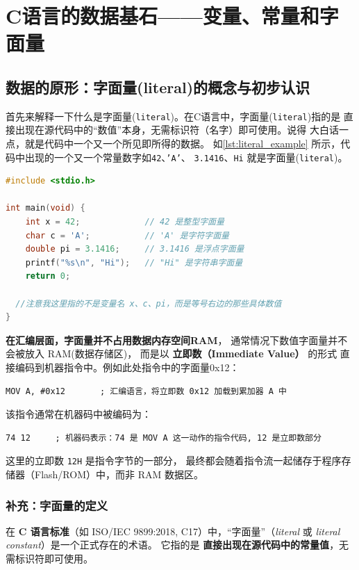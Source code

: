 \section{C语言的数据基石——变量、常量和字面量}

\subsection{数据的原形：字面量(literal)的概念与初步认识}

首先来解释一下什么是字面量(\texttt{literal})。在C语言中，字面量(\texttt{literal})指的是
直接出现在源代码中的“数值”本身，无需标识符（名字）即可使用。说得
大白话一点，就是代码中一个又一个所见即所得的数据。
如\autoref{lst:literal_example}
所示，代码中出现的一个又一个常量数字如\texttt{42}、\texttt{'A'}、
\texttt{3.1416}、\texttt{Hi}
就是字面量(\texttt{literal})。


\begin{lstlisting}[language=C,caption={C 语言中字面量的示例},label={lst:literal_example}]
#include <stdio.h>

int main(void) {
    int x = 42;             // 42 是整型字面量
    char c = 'A';           // 'A' 是字符字面量
    double pi = 3.1416;     // 3.1416 是浮点字面量
    printf("%s\n", "Hi");   // "Hi" 是字符串字面量
    return 0;

  //注意我这里指的不是变量名 x、c、pi，而是等号右边的那些具体数值  
}
\end{lstlisting}

\textbf{在汇编层面，字面量并不占用数据内存空间RAM}，
通常情况下数值字面量并不会被放入 RAM(数据存储区)，
而是以 \textbf{立即数（Immediate Value）} 的形式
直接编码到机器指令中。例如此处指令中的字面量0x12：

\begin{lstlisting}
MOV A, #0x12       ; 汇编语言，将立即数 0x12 加载到累加器 A 中
\end{lstlisting}

该指令通常在机器码中被编码为：

\begin{lstlisting}
74 12     ; 机器码表示：74 是 MOV A 这一动作的指令代码, 12 是立即数部分
\end{lstlisting}

这里的立即数 \verb|12H| 是指令字节的一部分，
最终都会随着指令流一起储存于程序存储器（Flash/ROM）中，而非 RAM 数据区。

\subsubsection{补充：字面量的定义}
在 \textbf{C 语言标准}（如 ISO/IEC 9899:2018, C17）中，``字面量''（\textit{literal} 或 \textit{literal constant}）是一个正式存在的术语。  
它指的是 \textbf{直接出现在源代码中的常量值}，无需标识符即可使用。


